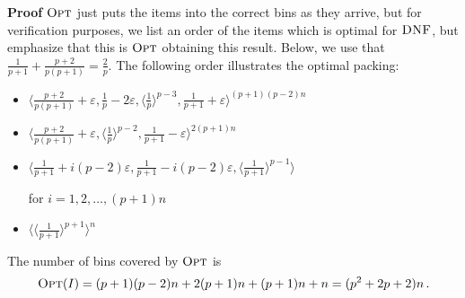 \documentclass[11pt]{article}
\newenvironment{proof}{\begin{trivlist}\item[]{\bf Proof }}{\hspace*{\fill}\raisebox{-1pt}{\boldmath$\Box$}\end{trivlist}}
\newcommand{\OPT}{\ensuremath{\operatorname{\textsc{Opt}}}\xspace}
\newcommand{\DNF}{\ensuremath{\operatorname{\textsc{DNF}}}\xspace}
\newcommand{\SEQ}[1]{\langle #1 \rangle}
\newcommand{\p}{p}
\newcommand{\eps}{\ensuremath{\varepsilon}\xspace}
\begin{document}
\begin{proof}
\OPT just puts the items into the correct bins
as they arrive, but for verification purposes, we list an order of the
items which is optimal for \DNF, but emphasize that this is \OPT obtaining
this result.
Below, we use that $\frac{1}{\p+1}+\frac{\p+2}{\p(\p+1)}=\frac{2}{\p}$.
The following order illustrates the optimal packing:
\begin{itemize}
 \item $\displaystyle \SEQ{ \frac{\p+2}{\p(\p+1)}+\varepsilon, \frac{1}{\p}-2\varepsilon, \SEQ{ \frac{1}{\p}}^{\p-3},\frac{1}{\p+1}+\varepsilon }^{(\p+1)(\p-2)n}$
 \item $\displaystyle \SEQ{ \frac{\p+2}{\p(\p+1)}+\varepsilon, \SEQ{\frac{1}{\p}}^{\p-2},\frac{1}{\p+1}-\eps }^{2(\p+1)n}$
 \item $\displaystyle \SEQ{ \frac{1}{\p+1} + i(\p-2)\varepsilon, \frac{1}{\p+1} - i(\p-2)\varepsilon, \SEQ{\frac{1}{\p+1}}^{\p-1}}$

 for $i=1,2,\dots,(\p+1)n$
 \item $\displaystyle \SEQ{\SEQ{\frac{1}{\p+1}}^{\p+1}}^{n}$
\end{itemize}
The number of bins covered by \OPT is
 $$\OPT(I) = (\p+1)(\p-2)n+2(\p+1)n+(\p+1)n+n=(\p^2+2\p+2)n\,.$$
\end{proof}
\end{document}
